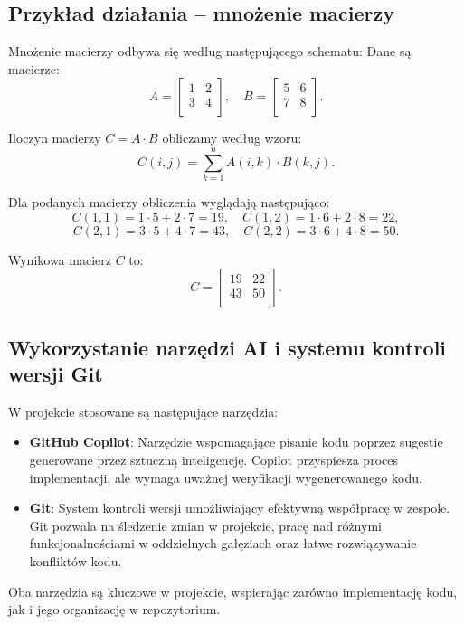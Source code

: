 \subsection{Przykład działania – mnożenie macierzy}
Mnożenie macierzy odbywa się według następującego schematu:
Dane są macierze:
\[
  A =
  \begin{bmatrix}
    1 & 2 \\
    3 & 4 \\
  \end{bmatrix}, \quad
  B =
  \begin{bmatrix}
    5 & 6 \\
    7 & 8 \\
  \end{bmatrix}.
\]

Iloczyn macierzy \( C = A \cdot B \) obliczamy według wzoru:
\[
  C(i, j) = \sum_{k=1}^n A(i, k) \cdot B(k, j).
\]

Dla podanych macierzy obliczenia wyglądają następująco:
\[
  C(1, 1) = 1 \cdot 5 + 2 \cdot 7 = 19, \quad
  C(1, 2) = 1 \cdot 6 + 2 \cdot 8 = 22,
\]
\[
  C(2, 1) = 3 \cdot 5 + 4 \cdot 7 = 43, \quad
  C(2, 2) = 3 \cdot 6 + 4 \cdot 8 = 50.
\]

Wynikowa macierz \( C \) to:
\[
  C =
  \begin{bmatrix}
    19 & 22 \\
    43 & 50 \\
  \end{bmatrix}.
\]

\subsection{Wykorzystanie narzędzi AI i systemu kontroli wersji Git}
W projekcie stosowane są następujące narzędzia:
\begin{itemize}
  \item \textbf{GitHub Copilot}: Narzędzie wspomagające pisanie kodu poprzez sugestie generowane przez sztuczną inteligencję. Copilot przyspiesza proces implementacji, ale wymaga uważnej weryfikacji wygenerowanego kodu.
  \item \textbf{Git}: System kontroli wersji umożliwiający efektywną współpracę w zespole. Git pozwala na śledzenie zmian w projekcie, pracę nad różnymi funkcjonalnościami w oddzielnych gałęziach oraz łatwe rozwiązywanie konfliktów kodu.
\end{itemize}

Oba narzędzia są kluczowe w projekcie, wspierając zarówno implementację kodu, jak i jego organizację w repozytorium.
